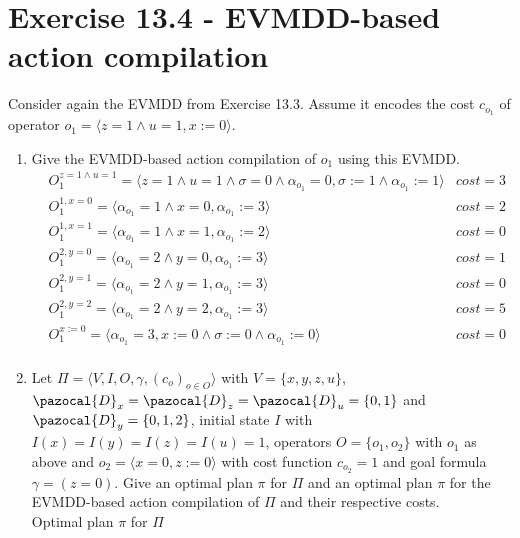\documentclass[11pt,a4paper]{article}
\begin{document}
\section*{Exercise 13.4 - EVMDD-based action compilation}
Consider again the EVMDD from Exercise 13.3. Assume it encodes the cost $c_{o_1}$ of operator $o_1 = \langle z = 1 \land u = 1, x := 0\rangle$.

\begin{enumerate}[label=\alph*)]
	\item Give the EVMDD-based action compilation of $o_1$ using this EVMDD.
	\begin{align*}
		&O_1^{z=1 \land u=1} = \langle z = 1 \land u = 1 \land \sigma = 0 \land \alpha_{o_1} = 0, \sigma := 1 \land \alpha_{o_1} := 1\rangle & cost=3&\\
		&O_1^{1, x=0} = \langle \alpha_{o_1} = 1 \land x = 0, \alpha_{o_1} := 3 \rangle & cost = 2&\\
		&O_1^{1, x=1} = \langle \alpha_{o_1} = 1 \land x = 1, \alpha_{o_1} := 2 \rangle & cost = 0&\\
		&O_1^{2, y=0} = \langle \alpha_{o_1} = 2 \land y = 0, \alpha_{o_1} := 3 \rangle & cost = 1&\\
		&O_1^{2, y=1} = \langle \alpha_{o_1} = 2 \land y = 1, \alpha_{o_1} := 3 \rangle & cost = 0&\\
		&O_1^{2, y=2} = \langle \alpha_{o_1} = 2 \land y = 2, \alpha_{o_1} := 3 \rangle & cost = 5&\\
		&O_1^{x:=0} = \langle \alpha_{o_1} = 3, x := 0 \land \sigma := 0 \land \alpha_{o_1} := 0 \rangle & cost = 0&\\
	\end{align*}
	\item Let $\Pi = \langle V, I, O, \gamma, (c_o)_{o \in O} \rangle$ with $V = \{x, y, z, u\}$, $\pazocal{D}_x =\pazocal{D}_z = \pazocal{D}_u = \{0, 1\}$ and $\pazocal{D}_y = \{0, 1, 2\}$, initial state $I$ with $I(x) = I(y) = I(z) = I(u) = 1$, operators $O = \{o_1, o_2\}$ with $o_1$ as above and $o_2 = \langle x = 0, z := 0\rangle$ with cost function $c_{o_2} = 1$ and goal formula $\gamma = (z = 0)$. Give an optimal plan $\pi$ for $\Pi$ and an optimal plan $\pi$ for the EVMDD-based action compilation of $\Pi$ and their respective costs.\\
	Optimal plan $\pi$ for $\Pi$\\
\end{enumerate}
\end{document}
